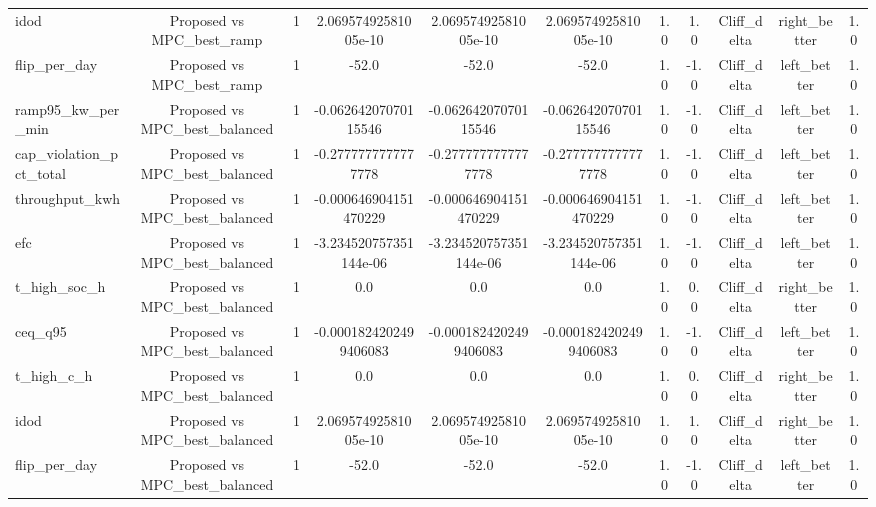 \begin{table}[t]
\begin{tabular}{lcccccccccc}
idod & Proposed vs MPC\_best\_ramp & 1 & 2.06957492581005e-10 & 2.06957492581005e-10 & 2.06957492581005e-10 & 1.0 & 1.0 & Cliff\_delta & right\_better & 1.0 \\
flip\_per\_day & Proposed vs MPC\_best\_ramp & 1 & -52.0 & -52.0 & -52.0 & 1.0 & -1.0 & Cliff\_delta & left\_better & 1.0 \\
ramp95\_kw\_per\_min & Proposed vs MPC\_best\_balanced & 1 & -0.06264207070115546 & -0.06264207070115546 & -0.06264207070115546 & 1.0 & -1.0 & Cliff\_delta & left\_better & 1.0 \\
cap\_violation\_pct\_total & Proposed vs MPC\_best\_balanced & 1 & -0.2777777777777778 & -0.2777777777777778 & -0.2777777777777778 & 1.0 & -1.0 & Cliff\_delta & left\_better & 1.0 \\
throughput\_kwh & Proposed vs MPC\_best\_balanced & 1 & -0.000646904151470229 & -0.000646904151470229 & -0.000646904151470229 & 1.0 & -1.0 & Cliff\_delta & left\_better & 1.0 \\
efc & Proposed vs MPC\_best\_balanced & 1 & -3.234520757351144e-06 & -3.234520757351144e-06 & -3.234520757351144e-06 & 1.0 & -1.0 & Cliff\_delta & left\_better & 1.0 \\
t\_high\_soc\_h & Proposed vs MPC\_best\_balanced & 1 & 0.0 & 0.0 & 0.0 & 1.0 & 0.0 & Cliff\_delta & right\_better & 1.0 \\
ceq\_q95 & Proposed vs MPC\_best\_balanced & 1 & -0.0001824202499406083 & -0.0001824202499406083 & -0.0001824202499406083 & 1.0 & -1.0 & Cliff\_delta & left\_better & 1.0 \\
t\_high\_c\_h & Proposed vs MPC\_best\_balanced & 1 & 0.0 & 0.0 & 0.0 & 1.0 & 0.0 & Cliff\_delta & right\_better & 1.0 \\
idod & Proposed vs MPC\_best\_balanced & 1 & 2.06957492581005e-10 & 2.06957492581005e-10 & 2.06957492581005e-10 & 1.0 & 1.0 & Cliff\_delta & right\_better & 1.0 \\
flip\_per\_day & Proposed vs MPC\_best\_balanced & 1 & -52.0 & -52.0 & -52.0 & 1.0 & -1.0 & Cliff\_delta & left\_better & 1.0 \\
\bottomrule
\end{tabular}
\end{table}